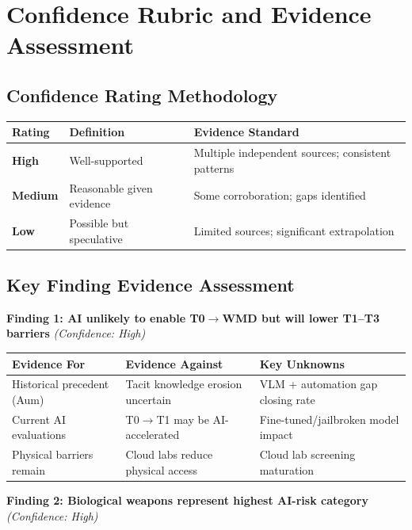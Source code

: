\documentclass[11pt,letterpaper]{article}
\begin{document}
\section{Confidence Rubric and Evidence Assessment}

\subsection*{Confidence Rating Methodology}

\begin{center}
\small
\begin{tabular}{L{2cm}L{4cm}L{6cm}}
\toprule
\textbf{Rating} & \textbf{Definition} & \textbf{Evidence Standard} \\
\midrule
\textbf{High} & Well-supported & Multiple independent sources; consistent patterns \\
\textbf{Medium} & Reasonable given evidence & Some corroboration; gaps identified \\
\textbf{Low} & Possible but speculative & Limited sources; significant extrapolation \\
\bottomrule
\end{tabular}
\end{center}

\subsection*{Key Finding Evidence Assessment}

\textbf{Finding 1: AI unlikely to enable T0$\rightarrow$WMD but will lower T1--T3 barriers} \textit{(Confidence: High)}

\begin{center}
\small
\begin{tabular}{L{4cm}L{4cm}L{4cm}}
\toprule
\textbf{Evidence For} & \textbf{Evidence Against} & \textbf{Key Unknowns} \\
\midrule
Historical precedent (Aum) & Tacit knowledge erosion uncertain & VLM + automation gap closing rate \\
Current AI evaluations & T0$\rightarrow$T1 may be AI-accelerated & Fine-tuned/jailbroken model impact \\
Physical barriers remain & Cloud labs reduce physical access & Cloud lab screening maturation \\
\bottomrule
\end{tabular}
\end{center}

\textbf{Finding 2: Biological weapons represent highest AI-risk category} \textit{(Confidence: High)}
\end{document}
